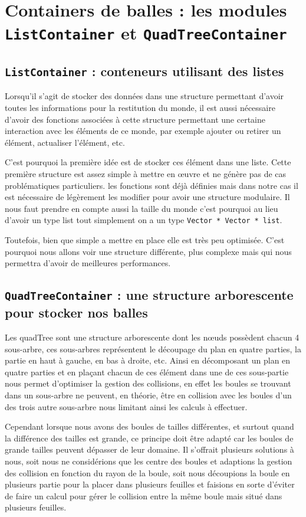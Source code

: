 \documentclass[a4paper]{scrartcl}
\begin{document}
\section{Containers de balles : les modules \texttt{ListContainer}
  et \texttt{QuadTreeContainer}}
\subsection{\texttt{ListContainer} : conteneurs utilisant des listes}

Lorsqu'il s'agit de stocker des données dans une structure permettant
d'avoir toutes les informations pour la restitution du monde, il est
aussi nécessaire d'avoir des fonctions associées à cette structure
permettant une certaine interaction avec les éléments de ce monde, par
exemple ajouter ou retirer un élément, actualiser l'élément, etc.

C'est pourquoi la première idée est de stocker ces élément dans une
liste. Cette première structure est assez simple à mettre en œuvre et
ne génère pas de cas problématiques particuliers. les fonctions sont
déjà définies mais dans notre cas il est nécessaire de légèrement les
modifier pour avoir une structure modulaire.  Il nous faut prendre en
compte aussi la taille du monde c'est pourquoi au lieu d'avoir un type
list tout simplement on a un type \texttt{Vector * Vector * list}.

Toutefois, bien que simple a mettre en place elle est très peu
optimisée. C'est pourquoi nous allons voir une structure différente,
plus complexe mais qui nous permettra d'avoir de meilleures
performances.


\subsection{\texttt{QuadTreeContainer} : une structure arborescente
  pour stocker nos balles}

Les quadTree sont une structure arborescente dont les nœuds possèdent
chacun 4 sous-arbre, ces sous-arbres représentent le découpage du plan
en quatre parties, la partie en haut à gauche, en bas à droite,
etc. Ainsi en décomposant un plan en quatre parties et en plaçant
chacun de ces élément dans une de ces sous-partie nous permet
d'optimiser la gestion des collisions, en effet les boules se trouvant
dans un sous-arbre ne peuvent, en théorie, être en collision avec les
boules d'un des trois autre sous-arbre nous limitant ainsi les calculs
à effectuer.

Cependant lorsque nous avons des boules de tailles différentes, et
surtout quand la différence des tailles est grande, ce principe doit
être adapté car les boules de grande tailles peuvent dépasser de leur
domaine.  Il s'offrait plusieurs solutions à nous, soit nous ne
considérions que les centre des boules et adaptions la gestion des
collision en fonction du rayon de la boule, soit nous découpions la
boule en plusieurs partie pour la placer dans plusieurs feuilles et
faisions en sorte d'éviter de faire un calcul pour gérer le collision
entre la même boule mais situé dans plusieurs feuilles.
\end{document}

